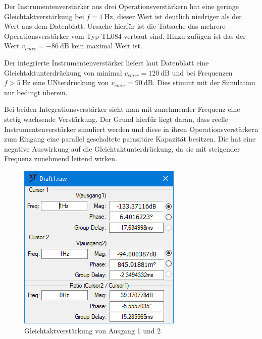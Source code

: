         Der Instrumentenverstärker aus drei Operationsverstärkern hat eine geringe Gleichtaktverstärkung bei \(f=\SI{1}{\Hz}\), dieser Wert ist deutlich niedriger als der Wert aus dem Datenblatt. Ursache hierfür ist die Tatsache das mehrere Operationsverstärker vom Typ TL084 verbaut sind. 
        Hinzu zufügen ist das der Wert \(v_{cmrr}=-\SI{86}{\dB}\) kein maximal Wert ist.\par
        Der integrierte Instrumentenverstärker liefert laut Datenblatt eine Gleichtaktunterdrückung von minimal \(v_{cmrr}=\SI{120}{\dB}\) und bei Frequenzen \(f>\SI{5}{\Hz}\) eine UNterdrückung von \(v_{cmrr}=\SI{90}{\dB}\). Dies stimmt mit der Simulation nur bedingt überein. \par
        Bei beiden Integrationsverstärker sieht man mit zunehmender Frequenz eine stetig wachsende Verstärkung. Der Grund hierfür liegt daran, dass reelle Instrumentenverstärker simuliert werden und diese in ihren Operationsverstärkern zum Eingang eine parallel geschaltete parasitäre Kapazität besitzen. 
        Die hat eine negative Auswirkung auf die Gleichtaktunterdrückung, da sie mit steigender Frequenz zunehmend leitend wirken. 
        
        \begin{figure}[ht!]
            \centering
            \includegraphics[]{gleichtaktwert.PNG}
            \caption{Gleichtaktverstärkung von Ausgang 1 und 2}
            \label{gleichtaktwerte}
        \end{figure}
        \newpage
